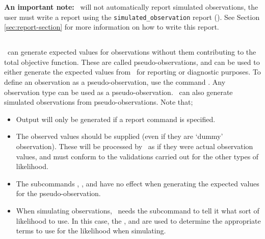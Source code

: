 {{{{\textbf{An important note:} \CNAME\ will not automatically report simulated observations, the user must write a report using the \texttt{simulated\_observation} report (). See Section \ref{sec:report-section} for more information on how to write this report.




\subsection{}
\CNAME\ can generate expected values for observations without them contributing to the total objective function. These are called pseudo-observations, and can be used to either generate the expected values from \CNAME\ for reporting or diagnostic purposes. To define an observation as a pseudo-observation, use the command . Any observation type can be used as a pseudo-observation. \CNAME\ can also generate simulated observations from pseudo-observations. Note that;

\begin{itemize}
  \item Output will only be generated if a report command  is specified.
  \item The observed values should be supplied (even if they are `dummy' observation). These will be processed by \CNAME\ as if they were actual observation values, and must conform to the validations carried out for the other types of likelihood. 
  \item The subcommands , ,  and  have no effect when generating the expected values for the pseudo-observation.   
  \item When simulating observations, \CNAME\ needs the subcommand  to tell it what sort of likelihood to use. In this case, the ,  and  are used to determine the appropriate terms to use for the likelihood when simulating.
\end{itemize}

\subsection{}\label{sec:Residuals}}

}}}
